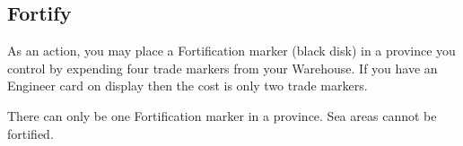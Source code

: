 \subsection{Fortify}

As an action, you may place a Fortification marker (black disk) in a province you control by expending four trade markers from your Warehouse. If you have an Engineer card on display then the cost is only two trade markers.

There can only be one Fortification marker in a province. Sea areas cannot be fortified.